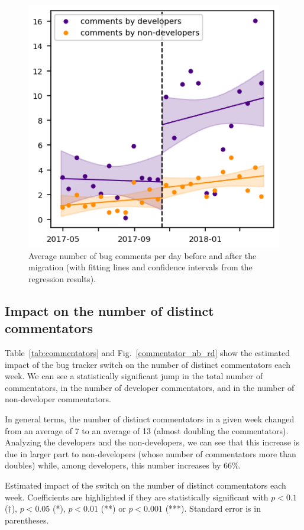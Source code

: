 \documentclass[conference]{IEEEtran}
\begin{document}
\begin{figure}
\includegraphics{comment_nb_rd.png}
\caption{Average number of bug comments per day before and after the migration (with fitting lines and confidence intervals from the regression results).} \label{comment_nb_rd}
\end{figure}

\subsection{Impact on the number of distinct commentators}

Table~\ref{tab:commentators} and Fig.~\ref{commentator_nb_rd} show the estimated impact of the bug tracker switch on the number of distinct commentators each week. We can see a statistically significant jump in the total number of commentators, in the number of developer commentators, and in the number of non-developer commentators.

In general terms, the number of distinct commentators in a given week changed from an average of 7 to an average of 13 (almost doubling the commentators). Analyzing the developers and the non-developers, we can see that this increase is due in larger part to non-developers (whose number of commentators more than doubles) while, among developers, this number increases by 66\%.

\begin{table}
\centering
\caption{Estimated impact of the switch on the number of distinct commentators each week. Coefficients are highlighted if they are statistically significant with $p<0.1$ ($\dagger$), $p<0.05$ (*), $p<0.01$ (**) or $p<0.001$ (***). Standard error is in parentheses.}
\label{tab:commentators}

\end{table}
\end{document}
